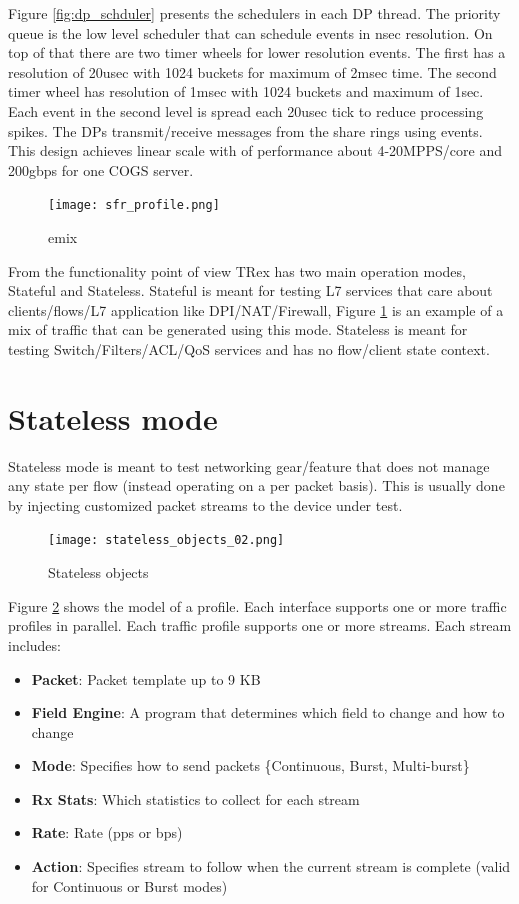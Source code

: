 \documentclass[conference]{IEEEtran}
\begin{document}
Figure \ref{fig:dp_schduler} presents the schedulers in each DP thread. The priority queue is the low level scheduler that can schedule events in nsec resolution. On top of that there are two timer wheels for lower resolution events. The first has a resolution of 20usec with 1024 buckets for maximum of 2msec time. 
The second timer wheel has resolution of 1msec with 1024 buckets and maximum of 1sec. Each event in the second level is spread each 20usec tick to reduce processing spikes. 
The DPs transmit/receive messages from the share rings using events. 
This design achieves linear scale with of performance about 4-20MPPS/core and 200gbps for one COGS server. 

\begin{figure}[h]
  \texttt{[image: sfr\_profile.png]}
  \caption{emix}
  \label{fig:emix}
\end{figure}


From the functionality point of view TRex has two main operation modes, Stateful and Stateless. 
Stateful is meant for testing L7 services that care about clients/flows/L7 application like DPI/NAT/Firewall, Figure \ref{fig:emix} is an example of a mix of traffic that can be generated using this mode. 
Stateless is meant for testing Switch/Filters/ACL/QoS services and has no flow/client state context.

\section{Stateless mode}

Stateless mode is meant to test networking gear/feature that does not manage any state per flow (instead operating on a per packet basis). 
This is usually done by injecting customized packet streams to the device under test.

\begin{figure}[h]
  \texttt{[image: stateless\_objects\_02.png]}
  \caption{Stateless objects}
  \label{fig:stlobjects}
\end{figure}

Figure \ref{fig:stlobjects} shows the model of a profile. Each interface supports one or more traffic profiles in parallel.
Each traffic profile supports one or more streams. Each stream includes:

\begin{itemize}
  \item \textbf{Packet}: Packet template up to 9 KB
  \item \textbf{Field Engine}: A program that determines which field to change and how to change 
  \item \textbf{Mode}: Specifies how to send packets \{Continuous, Burst, Multi-burst\}
  \item \textbf{Rx Stats}: Which statistics to collect for each stream
  \item \textbf{Rate}: Rate (pps or bps)
  \item \textbf{Action}: Specifies stream to follow when the current stream is complete (valid for Continuous or Burst modes)
\end{itemize}
\end{document}
